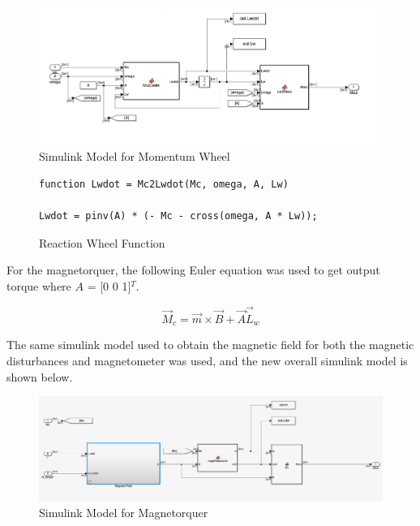 \begin{figure}[H]
    \centering
    \captionsetup{ justification = centering }
    \includegraphics[width = 15cm]{Images/PS9/momentumWheelModel.png}
    \caption{Simulink Model for Momentum Wheel}
    \label{fig:simulink_mw}
\end{figure}

\begin{figure}[H]
    \centering
    \captionsetup{ justification = centering}
    \begin{lstlisting}
function Lwdot = Mc2Lwdot(Mc, omega, A, Lw)

Lwdot = pinv(A) * (- Mc - cross(omega, A * Lw));
    \end{lstlisting}
    \caption{Reaction Wheel Function}
    \label{fig:rwCode}
\end{figure}

For the magnetorquer, the following Euler equation was used to get output torque where $A$ = [0 0 1]$^T$.

\begin{equation}
    \Vec{M}_c = \Vec{m} \times \Vec{B} + \Vec{A} \Vec{\dot L}_w
\end{equation}

The same simulink model used to obtain the magnetic field for both the magnetic disturbances and magnetometer was used, and the new overall simulink model is shown below.

\begin{figure}[H]
    \centering
    \captionsetup{ justification = centering }
    \includegraphics[width = 15cm]{Images/PS9/magnetorquerModel.png}
    \caption{Simulink Model for Magnetorquer}
    \label{fig:simulink_magnetorquer}
\end{figure}

